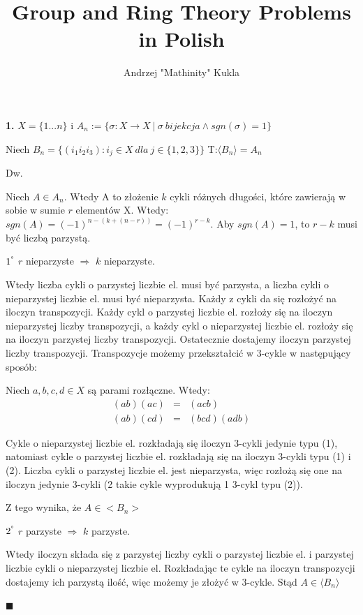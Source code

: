 \documentclass{article}
\title{Group and Ring Theory Problems in Polish}
\author{Andrzej "Mathinity" Kukla}
\date{ }
\begin{document}
\maketitle
\begin{center}
\Large \textbf{1.} $X=\{1...n\}$ i $A_n:=\{ \sigma :X \rightarrow X \ |\  \sigma \ bijekcja \wedge sgn(\sigma) = 1\}$

Niech $B_n=\{(i_1 i_2 i_3): i_j \in X\ dla\ j\in \{1,2,3\}\}$ T:$\langle B_n\rangle=A_n$
\end{center}
\normalsize

Dw. 

Niech $A\in A_n$. Wtedy A to złożenie $k$ cykli różnych długości, które zawierają w sobie w sumie $r$ elementów X. Wtedy: $sgn(A)=(-1)^{n-(k+(n-r))}=(-1)^{r-k}$. Aby $sgn(A)=1$, to $r-k$ musi być liczbą parzystą.

$1^{\degree }$ $r$ nieparzyste $\Rightarrow$ $k$ nieparzyste.

Wtedy liczba cykli o parzystej liczbie el. musi być parzysta, a liczba cykli o nieparzystej liczbie el. musi być nieparzysta. Każdy z cykli da się rozłożyć na iloczyn transpozycji. Każdy cykl o parzystej liczbie el. rozłoży się na iloczyn nieparzystej liczby transpozycji, a każdy cykl o nieparzystej liczbie el. rozłoży się na iloczyn parzystej liczby transpozycji. Ostatecznie dostajemy iloczyn parzystej liczby transpozycji. Transpozycje możemy przekształcić w 3-cykle w następujący sposób: 

Niech $a,b,c,d\in X$ są parami rozłączne. Wtedy:
\begin{eqnarray}
(ab)(ac)&=&(acb)\\
(ab)(cd)&=&(bcd)(adb)
\end{eqnarray}


Cykle o nieparzystej liczbie el. rozkładają się iloczyn 3-cykli jedynie typu (1), natomiast cykle o parzystej liczbie el. rozkładają się na iloczyn 3-cykli typu (1) i (2). Liczba cykli o parzystej liczbie el. jest nieparzysta, więc rozłożą się one na iloczyn jedynie 3-cykli (2 takie cykle wyprodukują 1 3-cykl typu (2)).

Z tego wynika, że $A\in <B_n>$ 

$2^{\degree }$ $r$ parzyste $\Rightarrow$ $k$ parzyste.

Wtedy iloczyn składa się z parzystej liczby cykli o parzystej liczbie el. i parzystej liczbie cykli o nieparzystej liczbie el. Rozkładając te cykle na iloczyn transpozycji dostajemy ich parzystą ilość, więc możemy je złożyć w 3-cykle. Stąd $A\in \langle B_n\rangle$ 
\begin{flushright}
$\blacksquare$
\end{flushright}
\end{document}
